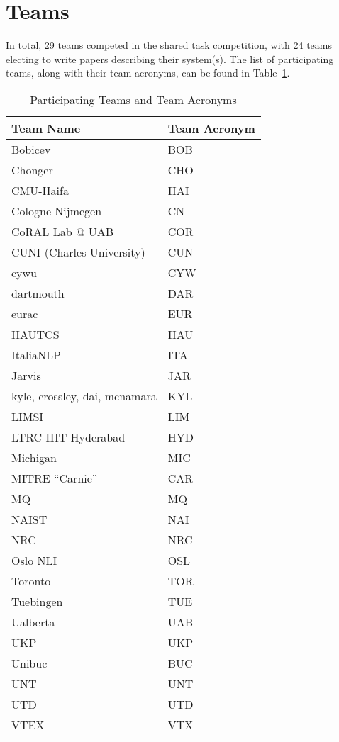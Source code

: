 \documentclass[11pt,letterpaper]{article}
\begin{document}
\section{Teams}
\label{sec-teams}
In total, 29 teams competed in the shared task competition, with 24 teams
electing to write papers describing their system(s).  The list
of participating teams, along with their team acronyms, can be
found in Table~\ref{tab:teams}.


\begin{table}[!ht]
\begin{small}
\begin{center}
\begin{tabular}{|l|l|}
\hline
\textbf{Team Name} & \textbf{Team Acronym} \\ \hline
Bobicev & BOB  \\ \hline
Chonger & CHO  \\ \hline
CMU-Haifa & HAI  \\ \hline
Cologne-Nijmegen &  CN \\ \hline
CoRAL Lab @ UAB &  COR \\ \hline
CUNI (Charles University) &  CUN \\ \hline
cywu &  CYW \\ \hline
dartmouth & DAR  \\ \hline
eurac & EUR  \\ \hline
HAUTCS & HAU  \\ \hline
ItaliaNLP &  ITA \\ \hline
Jarvis &   JAR\\ \hline
kyle, crossley, dai, mcnamara & KYL  \\ \hline
LIMSI & LIM  \\ \hline
LTRC IIIT Hyderabad &  HYD \\ \hline
Michigan &  MIC \\ \hline
MITRE ``Carnie'' & CAR  \\ \hline
MQ &   MQ\\ \hline
NAIST &  NAI \\ \hline
NRC &  NRC \\ \hline
Oslo NLI & OSL  \\ \hline
Toronto &  TOR \\ \hline
Tuebingen &   TUE\\ \hline
Ualberta &  UAB \\ \hline
UKP &  UKP \\ \hline
Unibuc &  BUC \\ \hline
UNT &   UNT\\ \hline
UTD &  UTD \\ \hline
VTEX &  VTX \\ \hline

\end{tabular}
\end{center}
\end{small}
\caption{Participating Teams and Team Acronyms\label{tab:teams}}

\end{table}
\end{document}
